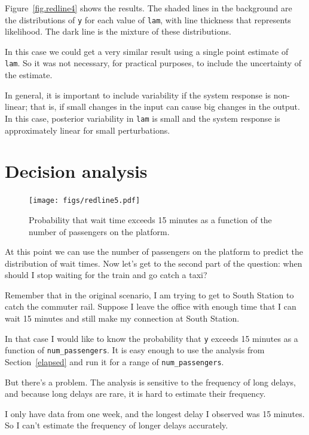 \documentclass[12pt]{book}
\theoremstyle{exercise}
\begin{document}
Figure~\ref{fig.redline4} shows the results.  The shaded lines
in the background are the distributions of {\tt y} for each value
of {\tt lam}, with line thickness that represents likelihood.
The dark line is the mixture of these distributions.

In this case we could get a very similar result using a single point
estimate of {\tt lam}.  So it was not necessary, for practical purposes,
to include the uncertainty of the estimate.

In general, it is important to include variability if the system
response is non-linear; that is, if small changes in the input can
cause big changes in the output.  In this case, posterior variability
in {\tt lam} is small and the system response is approximately
linear for small perturbations.


\section{Decision analysis}

\begin{figure}
\centerline{\texttt{[image: figs/redline5.pdf]}}
\caption{Probability that wait time exceeds 15 minutes as
a function of the number of passengers on the platform. }
\label{fig.redline5}
\end{figure}

At this point we can use the number of passengers on the platform
to predict the distribution of wait times.  Now
let's get to the second part of the question: when should I stop
waiting for the train and go catch a taxi?

Remember that in the original scenario, I am trying to get to
South Station to catch the commuter rail.  Suppose I leave
the office with enough time that I can wait 15 minutes
and still make my connection at South Station.

In that case I would like to know the probability that {\tt y} exceeds
15 minutes as a function of \verb"num_passengers".  It is easy enough
to use the
analysis from Section~\ref{elapsed} and run it for a range of
\verb"num_passengers".

But there's a problem.
The analysis is sensitive to the frequency of long delays, and
because long delays are rare, it is hard to estimate
their frequency.

I only have data from one week,
and the longest delay I observed was 15 minutes.  So I can't
estimate the frequency of longer delays accurately.
\end{document}
